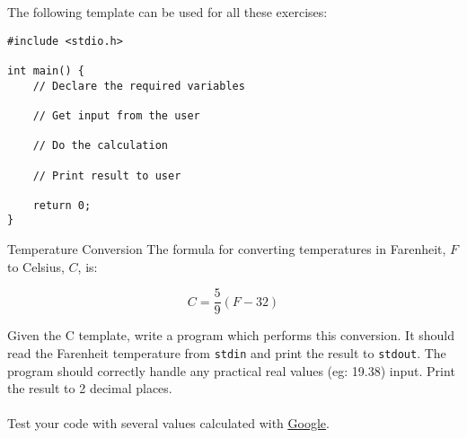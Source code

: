 \documentclass{lab}
\begin{document}
The following template can be used for all these exercises:

\begin{lstlisting}[style=CStyle]
#include <stdio.h>

int main() {
	// Declare the required variables 
	
	// Get input from the user
	
	// Do the calculation
	
	// Print result to user
	
	return 0;
}
\end{lstlisting}

\begin{task}{Temperature Conversion}{}
The formula for converting temperatures in Farenheit, $F$ to Celsius, $C$, is:

\begin{equation}\label{eq:temp}
C = \frac{5}{9}(F - 32)
\end{equation}

Given the C template, write a program which performs this conversion. It should read the Farenheit temperature from \texttt{stdin} and print the result to \texttt{stdout}. The program should correctly handle any practical real values (eg: 19.38) input. Print the result to 2 decimal places.
\\ \\
Test your code with several values calculated with \underline{\href{https://www.google.com.au/search?q=farenheit+to+celsius}{Google}}.
\end{task}
\end{document}
